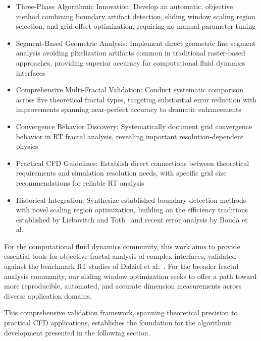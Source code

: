 \documentclass[preprint,12pt]{elsarticle}
\def\textbf#1{#1}%
\begin{document}
\begin{itemize}
\item \textbf{Three-Phase Algorithmic Innovation}: Develop an automatic, objective method combining boundary artifact detection, sliding window scaling region selection, and grid offset optimization, requiring no manual parameter tuning

\item \textbf{Segment-Based Geometric Analysis}: Implement direct geometric line segment analysis avoiding pixelization artifacts common in traditional raster-based approaches, providing superior accuracy for computational fluid dynamics interfaces

\item \textbf{Comprehensive Multi-Fractal Validation}: Conduct systematic comparison across five theoretical fractal types, targeting substantial error reduction with improvements spanning near-perfect accuracy to dramatic enhancements

\item \textbf{Convergence Behavior Discovery}: Systematically document grid convergence behavior in RT fractal analysis, revealing important resolution-dependent physics

\item \textbf{Practical CFD Guidelines}: Establish direct connections between theoretical requirements and simulation resolution needs, with specific grid size recommendations for reliable RT analysis

\item \textbf{Historical Integration}: Synthesize established boundary detection methods with novel scaling region optimization, building on the efficiency traditions established by Liebovitch and Toth~\cite{liebovitch1989} and recent error analysis by Bouda et al.~\cite{bouda2016}
\end{itemize}

For the computational fluid dynamics community, this work aims to provide essential tools for objective fractal analysis of complex interfaces, validated against the benchmark RT studies of Dalziel et al.~\cite{dalziel1999}. For the broader fractal analysis community, our sliding window optimization seeks to offer a path toward more reproducible, automated, and accurate dimension measurements across diverse application domains.

This comprehensive validation framework, spanning theoretical precision to practical CFD applications, establishes the foundation for the algorithmic development presented in the following section.
\end{document}
